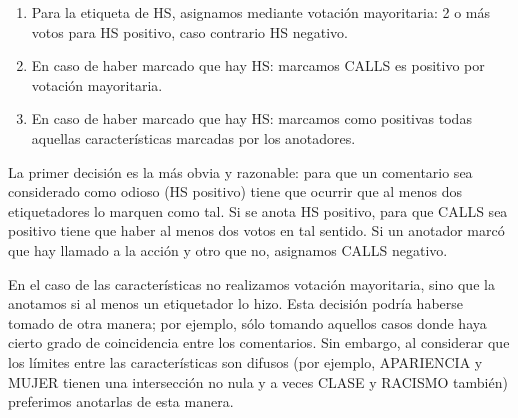 \begin{enumerate}
    \item Para la etiqueta de HS, asignamos mediante votación mayoritaria: 2 o más votos para HS positivo, caso contrario HS negativo.
    \item En caso de haber marcado que hay HS: marcamos CALLS es positivo por votación mayoritaria.
    \item En caso de haber marcado que hay HS: marcamos como positivas todas aquellas características marcadas por los anotadores.
\end{enumerate}

La primer decisión es la más obvia y razonable: para que un comentario sea considerado como odioso (HS positivo) tiene que ocurrir que al menos dos etiquetadores lo marquen como tal. Si se anota HS positivo, para que CALLS sea positivo tiene que haber al menos dos votos en tal sentido. Si un anotador marcó que hay llamado a la acción y otro que no, asignamos CALLS negativo. 

En el caso de las características no realizamos votación mayoritaria, sino que la anotamos si al menos un etiquetador lo hizo. Esta decisión podría haberse tomado de otra manera; por ejemplo, sólo tomando aquellos casos donde haya cierto grado de coincidencia entre los comentarios. Sin embargo, al considerar que los límites entre las características son difusos (por ejemplo, APARIENCIA y MUJER tienen una intersección no nula y a veces CLASE y RACISMO también) preferimos anotarlas de esta manera.
